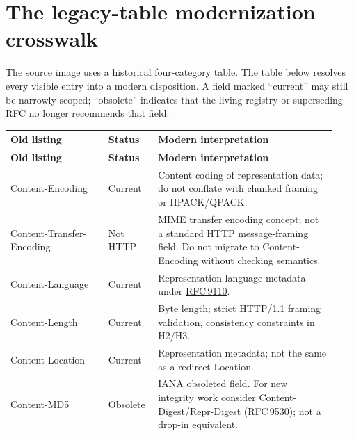\documentclass[10pt,letterpaper,oneside]{article}
\newcommand{\rf}[1]{\href{https://www.rfc-editor.org/rfc/rfc#1.html}{RFC\,#1}}
\begin{document}
\section{The legacy-table modernization crosswalk}
The source image uses a historical four-category table. The table below resolves every visible entry into a modern disposition. A field marked ``current'' may still be narrowly scoped; ``obsolete'' indicates that the living registry or superseding RFC no longer recommends that field.

\begingroup\footnotesize\setlength{\LTpre}{0.5em}\setlength{\LTpost}{0.5em}
\begin{longtable}{>{\RaggedRight\arraybackslash}p{0.29\linewidth}>{\RaggedRight\arraybackslash}p{0.13\linewidth}>{\RaggedRight\arraybackslash}p{0.51\linewidth}}
\toprule\rowcolor{Navy}\color{white}\sffamily\bfseries Old listing & \color{white}\sffamily\bfseries Status & \color{white}\sffamily\bfseries Modern interpretation \\ \midrule\endfirsthead
\toprule\rowcolor{Navy}\color{white}\sffamily\bfseries Old listing & \color{white}\sffamily\bfseries Status & \color{white}\sffamily\bfseries Modern interpretation \\ \midrule\endhead
{\ttfamily\color{Deep}Content-\allowbreak{}Encoding} & {\sffamily\scriptsize Current} & Content coding of representation data; do not conflate with chunked framing or HPACK/QPACK. \\ \midrule
{\ttfamily\color{Deep}Content-\allowbreak{}Transfer-\allowbreak{}Encoding} & {\sffamily\scriptsize Not HTTP} & MIME transfer encoding concept; not a standard HTTP message-framing field. Do not migrate to Content-Encoding without checking semantics. \\ \midrule
{\ttfamily\color{Deep}Content-\allowbreak{}Language} & {\sffamily\scriptsize Current} & Representation language metadata under \rf{9110}. \\ \midrule
{\ttfamily\color{Deep}Content-\allowbreak{}Length} & {\sffamily\scriptsize Current} & Byte length; strict HTTP/1.1 framing validation, consistency constraints in H2/H3. \\ \midrule
{\ttfamily\color{Deep}Content-\allowbreak{}Location} & {\sffamily\scriptsize Current} & Representation metadata; not the same as a redirect Location. \\ \midrule
{\ttfamily\color{Deep}Content-\allowbreak{}MD5} & {\sffamily\scriptsize Obsolete} & IANA obsoleted field. For new integrity work consider Content-Digest/Repr-Digest (\rf{9530}); not a drop-in equivalent. \\ \midrule

\end{longtable}
\end{document}
